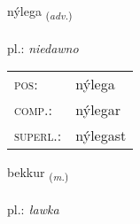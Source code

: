 \documentclass[frontgrid, backgrid]{flacards}\usepackage[]{graphicx}\usepackage[]{xcolor}
\begin{document}
\renewcommand{\flhead}{\vskip5pt \fboxsep=0pt {\small\bfseries\footnotesize Atviksorð | Adverb}}
\renewcommand{\fcfoot}{\vskip5pt \fboxsep=0pt \hspace{2pt}{\small\bfseries\footnotesize 2K}}

\renewcommand{\blhead}{\vskip5pt {\small\bfseries\footnotesize Atviksorð | Adverb }}
\renewcommand{\bcfoot}{\vskip5pt \hspace{2pt}{\small\bfseries\footnotesize 2K}}


{nýlega \small{\textsubscript{(\textit{adv.})}} \\[1ex] %
\textphonetic{[niːlɛɣa]} \\
pl.: \emph{niedawno} \\  [2ex]
\renewcommand*{\arraystretch}{0.8}
\begin{tabular}{ll}
\textsc{pos}: & nýlega \\ 
\textsc{comp.}: & nýlegar \\ 
\textsc{superl.}: & nýlegast \\
\end{tabular}
}

\renewcommand{\flhead}{\vskip5pt \fboxsep=0pt {\small\bfseries\footnotesize Nafnorð | Noun}}
\renewcommand{\fcfoot}{\vskip5pt \fboxsep=0pt \hspace{2pt}{\small\bfseries\footnotesize 2K}}

\renewcommand{\blhead}{\vskip5pt {\small\bfseries\footnotesize Nafnorð | Noun }}
\renewcommand{\bcfoot}{\vskip5pt \hspace{2pt}{\small\bfseries\footnotesize 2K}}


{bekkur \small{\textsubscript{(\textit{m.})}} \\[1ex] %
\textphonetic{[pɛhkʏr]} \\
pl.: \emph{ławka} \\  [2ex]
\renewcommand*{\arraystretch}{0.8}
}
\end{document}
